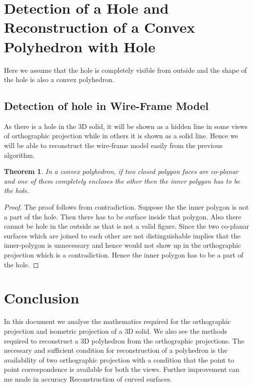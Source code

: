 \documentclass[12pt]{article}
\newtheorem{theorem}{Theorem}
\begin{document}
\section{Detection of a Hole and Reconstruction of a Convex Polyhedron with Hole}

    Here we assume that the hole is completely visible from outside and the shape of the hole is also a convex polyhedron.
    
    \subsection{Detection of hole in Wire-Frame Model}
        
        As there is a hole in the 3D solid, it will be shown as a hidden line in some views of orthographic projection while in others it is shown as a solid line. Hence we will be able to reconstruct the wire-frame model easily from the previous algorithm. 
        
        \begin{theorem}
            In a convex polyhedron, if two closed polygon faces are co-planar and one of them completely encloses the other then the inner polygon has to be the hole.      
        \end{theorem}
        \begin{proof}
            The proof follows from contradiction. Suppose the the inner polygon is not a part of the hole. Then there has to be surface inside that polygon. Also there cannot be hole in the outside as that is not a valid figure. Since the two co-planar surfaces which are joined to each other are not distinguishable implies that the inner-polygon is unnecessary and hence would not show up in the orthographic projection which is a contradiction. Hence the inner polygon has to be a part of the hole. 
        \end{proof}

\section{Conclusion}

    In this document we analyse the mathematics required for the orthographic projection and isometric projection of a 3D solid. We also see the methods required to reconstruct a 3D polyhedron from the orthographic projections. The necessary and sufficient condition for reconstruction of a polyhedron is the availability of two orthographic projection with a condition that the point to point correspondence is available for both the views. Further improvement can me made in accuracy Reconstruction of curved surfaces.

    
    
    
\end{document}
